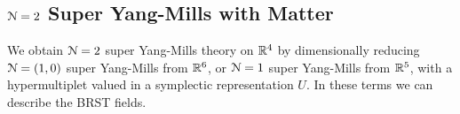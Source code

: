 \documentclass[10pt, oneside]{article}
\begin{document}
%
%
%


\subsection{$\mathcal N=2$ Super Yang-Mills with Matter}

We obtain $\mathcal{N}=2$ super Yang-Mills theory on $\mathbb R^4$ by dimensionally reducing $\mathcal{N}=(1,0)$ super Yang-Mills from $\mathbb R^6$, or $\mathcal{N}=1$ super Yang-Mills from $\mathbb R^5$, with a hypermultiplet valued in a symplectic representation $U$.  In these terms we can describe the BRST fields.
\end{document}
